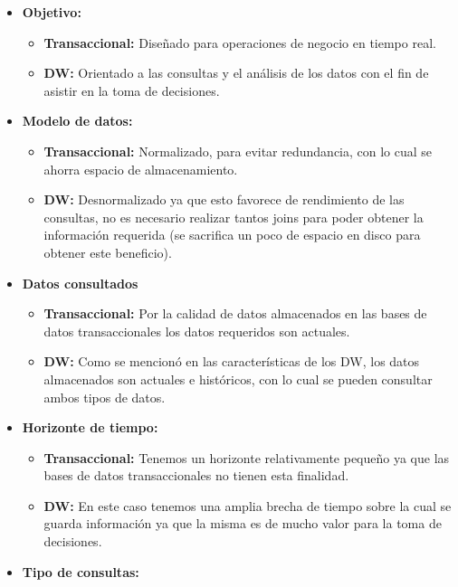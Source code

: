 \documentclass[a4paper,11pt]{article}
\begin{document}
    
    \begin{itemize}
      \item \textbf{Objetivo:} 
        \begin{itemize}
          \item \textbf{Transaccional:} Diseñado para operaciones de negocio en tiempo real.
          \item \textbf{DW:} Orientado a las consultas y el análisis de los datos con el fin de asistir en la toma de decisiones. 
        \end{itemize}
      \item \textbf{Modelo de datos:}
        \begin{itemize}
          \item \textbf{Transaccional:} Normalizado, para evitar redundancia, con lo cual se ahorra espacio de almacenamiento.
          \item \textbf{DW:} Desnormalizado ya que esto favorece de rendimiento de las consultas, no es necesario realizar tantos joins para poder obtener
          la información requerida (se sacrifica un poco de espacio en disco para obtener este beneficio).
        \end{itemize}
      \item \textbf{Datos consultados}
        \begin{itemize}
          \item \textbf{Transaccional:} Por la calidad de datos almacenados en las bases de datos transaccionales los datos requeridos son actuales.
          \item \textbf{DW:} Como se mencionó en las características de los DW, los datos almacenados son actuales e históricos, con lo cual se pueden
          consultar ambos tipos de datos.
        \end{itemize}
      \item \textbf{Horizonte de tiempo:}
        \begin{itemize}
          \item \textbf{Transaccional:} Tenemos un horizonte relativamente pequeño ya que las bases de datos transaccionales no tienen esta finalidad.
          \item \textbf{DW:} En este caso tenemos una amplia brecha de tiempo sobre la cual se guarda información ya que la misma es de mucho valor para
          la toma de decisiones.
        \end{itemize}
      \item \textbf{Tipo de consultas:}
        \begin{itemize}

\end{itemize}
\end{itemize}
\end{document}
